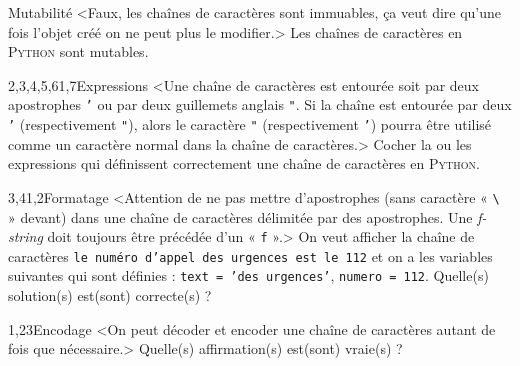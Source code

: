 \begin{quiz}[title={Chaînes de caractères}]
\vspace{-\baselineskip}
\begin{quizquestion*}[b]{2}{1}{Mutabilité}
<Faux, les chaînes de caractères sont immuables, ça veut dire qu'une fois l'objet créé on ne peut plus le modifier.> 
Les chaînes de caractères en \textsc{Python} sont mutables.
\end{quizquestion*}

\begin{quizquestion}[b]{2,3,4,5,6}{1,7}{Expressions}
<Une chaîne de caractères est entourée soit par deux apostrophes \texttt{'} ou par deux guillemets anglais \texttt{"}. Si la chaîne est entourée par deux \texttt{'} (respectivement \texttt{"}), alors le caractère \texttt{"} (respectivement \texttt{'}) pourra être utilisé comme un caractère normal dans la chaîne de caractères.> 
Cocher la ou les expressions qui définissent correctement une chaîne de caractères en \textsc{Python}.
\end{quizquestion}

\begin{quizquestion}[b]{3,4}{1,2}{Formatage}
<Attention de ne pas mettre d'apostro\-phes (sans caractère « \texttt{\textbackslash} » devant) dans une chaîne de caractères délimitée par des apostrophes. Une \textit{f-string} doit toujours être précédée d'un « \texttt{f} ».> 
On veut afficher la chaîne de caractères \texttt{le numéro d'appel des urgences est le 112} et on a les variables suivantes qui sont définies : \texttt{text = 'des urgences'}, \texttt{numero = 112}. Quelle(s) solution(s) est(sont) correcte(s) ?
\end{quizquestion}

\begin{quizquestion}[b]{1,2}{3}{Encodage}
<On peut décoder et encoder une chaîne de caractères autant de fois que nécessaire.> 
Quelle(s) affirmation(s) est(sont) vraie(s) ?
\end{quizquestion}
\end{quiz}

